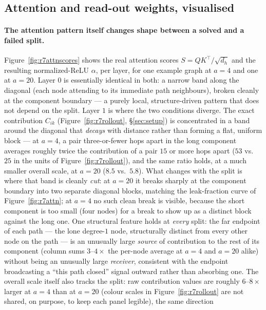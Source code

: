\documentclass[11pt,a4paper]{article}
\begin{document}
\subsection{Attention and read-out weights, visualised}
\label{sec:res-heatmaps}

\paragraph{The attention pattern itself changes shape between a solved and a
failed split.} Figure~\ref{fig:r7attnscores} shows the real attention scores
$S=QK^\top/\sqrt{d_h}$ and the resulting normalized-ReLU $\alpha$, per layer,
for one example graph at $a=4$ and one at $a=20$. Layer $0$ is essentially
identical in both: a narrow band along the diagonal (each node attending to
its immediate path neighbours), broken cleanly at the component boundary ---
a purely local, structure-driven pattern that does not depend on the split.
Layer $1$ is where the two conditions diverge. The exact contribution
$C_{ik}$ (Figure~\ref{fig:r7rollout}, \S\ref{sec:setup}) is concentrated in a
band around the diagonal that \emph{decays} with distance rather than forming
a flat, uniform block --- at $a=4$, a pair three-or-fewer hops apart in the
long component averages roughly twice the contribution of a pair $15$ or more
hops apart ($53$ vs.\ $25$ in the units of Figure~\ref{fig:r7rollout}), and
the same ratio holds, at a much smaller overall scale, at $a=20$ ($8.5$ vs.\
$5.8$). What changes with the split is where that band is cleanly \emph{cut}:
at $a=20$ it breaks sharply at the component boundary into two separate
diagonal blocks, matching the leak-fraction curve of Figure~\ref{fig:r7attn};
at $a=4$ no such clean break is visible, because the short component is too
small (four nodes) for a break to show up as a distinct block against the
long one. One structural feature holds at \emph{every} split: the far
endpoint of each path --- the lone degree-$1$ node, structurally distinct
from every other node on the path --- is an unusually large \emph{source} of
contribution to the rest of its component (column sums $3$--$4\times$ the
per-node average at $a=4$ and $a=20$ alike) without being an unusually large
\emph{receiver}, consistent with the endpoint broadcasting a ``this path
closed'' signal outward rather than absorbing one. The overall scale itself
also tracks the split: raw contribution values are roughly $6$--$8\times$
larger at $a=4$ than at $a=20$ (colour scales in Figure~\ref{fig:r7rollout}
are not shared, on purpose, to keep each panel legible), the same direction
\end{document}
